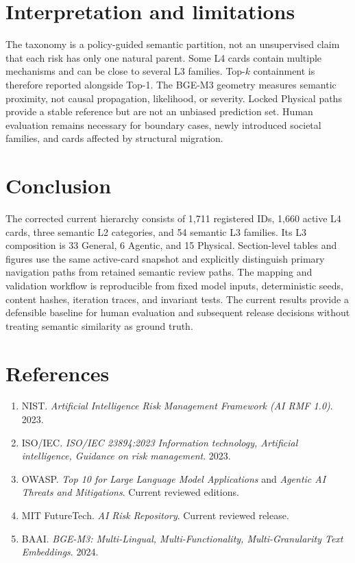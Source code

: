 \documentclass[11pt,a4paper]{article}
\begin{document}
\section{Interpretation and limitations}

The taxonomy is a policy-guided semantic partition, not an unsupervised claim
that each risk has only one natural parent. Some L4 cards contain multiple
mechanisms and can be close to several L3 families. Top-$k$ containment is
therefore reported alongside Top-1. The BGE-M3 geometry measures semantic
proximity, not causal propagation, likelihood, or severity. Locked Physical
paths provide a stable reference but are not an unbiased prediction set.
Human evaluation remains necessary for boundary cases, newly introduced
societal families, and cards affected by structural migration.

\section{Conclusion}

The corrected current hierarchy consists of 1,711 registered IDs, 1,660 active
L4 cards, three semantic L2 categories, and 54 semantic L3 families. Its L3
composition is 33 General, 6 Agentic, and 15 Physical. Section-level tables and
figures use the same active-card snapshot and explicitly distinguish primary
navigation paths from retained semantic review paths. The mapping and
validation workflow is reproducible from fixed model inputs, deterministic
seeds, content hashes, iteration traces, and invariant tests. The current
results provide a defensible baseline for human evaluation and subsequent
release decisions without treating semantic similarity as ground truth.

\section*{References}

\begin{enumerate}[leftmargin=2em]
  \item NIST. \textit{Artificial Intelligence Risk Management Framework
  (AI RMF 1.0)}. 2023.
  \item ISO/IEC. \textit{ISO/IEC 23894:2023 Information technology,
  Artificial intelligence, Guidance on risk management}. 2023.
  \item OWASP. \textit{Top 10 for Large Language Model Applications} and
  \textit{Agentic AI Threats and Mitigations}. Current reviewed editions.
  \item MIT FutureTech. \textit{AI Risk Repository}. Current reviewed release.
  \item BAAI. \textit{BGE-M3: Multi-Lingual, Multi-Functionality,
  Multi-Granularity Text Embeddings}. 2024.
\end{enumerate}
\end{document}
